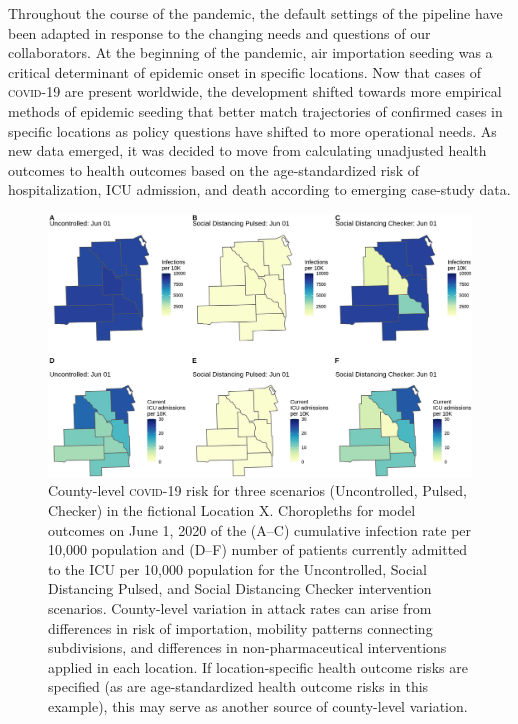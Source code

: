 {Throughout the course of the pandemic, the default settings of the pipeline have been adapted in response to the changing needs and questions of our collaborators. At the beginning of the pandemic, air importation seeding was a critical determinant of epidemic onset in specific locations. Now that cases of \textsc{covid}-19 are present worldwide, the development shifted towards more empirical methods of epidemic seeding that better match trajectories of confirmed cases in specific locations as policy questions have shifted to more operational needs. As new data emerged, it was decided to move from calculating unadjusted health outcomes to health outcomes based on the age-standardized risk of hospitalization, ICU admission, and death according to emerging case-study data. 
\begin{figure}[!htb]%
    \centering
    \includegraphics{fig_pipeline/fig4a}
    \caption[County-level \textsc{covid}-19 risk for three scenarios]{County-level \textsc{covid}-19 risk for three scenarios (Uncontrolled, Pulsed, Checker) in the fictional Location X. Choropleths for model outcomes on June 1, 2020 of the (A–C) cumulative infection rate per 10,000 population and (D–F) number of patients currently admitted to the ICU per 10,000 population for the Uncontrolled, Social Distancing Pulsed, and Social Distancing Checker intervention scenarios. County-level variation in attack rates can arise from differences in risk of importation, mobility patterns connecting subdivisions, and differences in non-pharmaceutical interventions applied in each location. If location-specific health outcome risks are specified (as are age-standardized health outcome risks in this example), this may serve as another source of county-level variation.}
    \label{fig:pipeline-map}
\end{figure}

}
